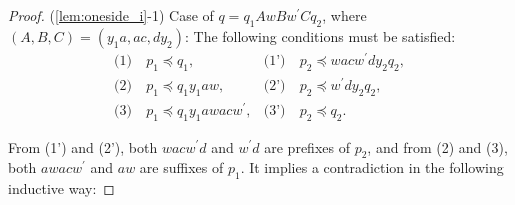 \begin{proof}
\smallskip

\noindent
(\ref{lem:oneside_i}-1) Case of $q=q_{1}AwBw^{\prime}Cq_{2}$, where {\color{red}$( A,B,C ) = ( y_{1}a,ac,dy_{2} )$}:
The following conditions must be satisfied:
\begin{align*}
  \textrm{(1)}~& p_{1} \preceq q_{1}, & \textrm{(1')}~& p_{2} \preceq wacw^{\prime}dy_{2}q_{2}, \\
  \textrm{(2)}~& p_{1} \preceq q_{1}y_{1}aw, & \textrm{(2')}~& p_{2} \preceq w^{\prime}dy_{2}q_{2}, \\
  \textrm{(3)}~& p_{1} \preceq q_{1}y_{1}awacw^{\prime}, & \textrm{(3')}~& p_{2} \preceq q_{2}.
\end{align*}

From (1') and (2'), {\color{red}both }$wacw^{\prime}d$ and $w^{\prime}d$ are prefixes of $p_{2}$, and from (2) and (3), {\color{red}both }$awacw^{\prime}$ and $aw$ are suffixes of $p_{1}$.
It implies a contradiction in the following inductive way:


\end{proof}
